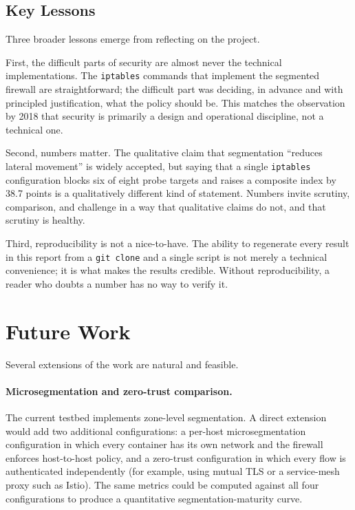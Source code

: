 \subsection{Key Lessons}

Three broader lessons emerge from reflecting on the project.

First, the difficult parts of security are almost never the technical implementations. The \texttt{iptables} commands that implement the segmented firewall are straightforward; the difficult part was deciding, in advance and with principled justification, what the policy should be. This matches the observation by \textcite{Schneier}{2018} that security is primarily a design and operational discipline, not a technical one.

Second, numbers matter. The qualitative claim that segmentation ``reduces lateral movement'' is widely accepted, but saying that a single \texttt{iptables} configuration blocks six of eight probe targets and raises a composite index by 38.7 points is a qualitatively different kind of statement. Numbers invite scrutiny, comparison, and challenge in a way that qualitative claims do not, and that scrutiny is healthy.

Third, reproducibility is not a nice-to-have. The ability to regenerate every result in this report from a \texttt{git clone} and a single script is not merely a technical convenience; it is what makes the results credible. Without reproducibility, a reader who doubts a number has no way to verify it.

\section{Future Work}

Several extensions of the work are natural and feasible.

\paragraph{Microsegmentation and zero-trust comparison.} The current testbed implements zone-level segmentation. A direct extension would add two additional configurations: a per-host microsegmentation configuration in which every container has its own network and the firewall enforces host-to-host policy, and a zero-trust configuration in which every flow is authenticated independently (for example, using mutual TLS or a service-mesh proxy such as Istio). The same metrics could be computed against all four configurations to produce a quantitative segmentation-maturity curve.

